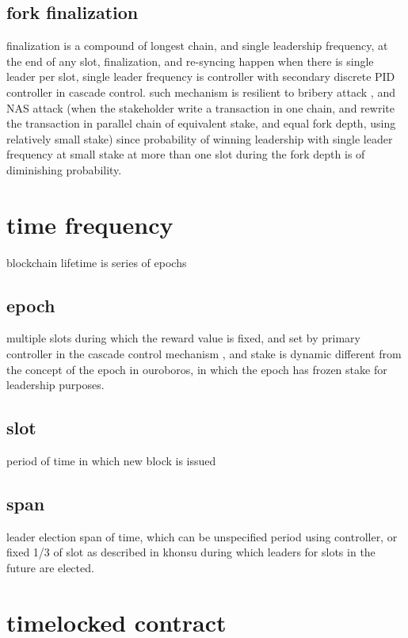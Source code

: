 \documentclass{article}
\begin{document}
\subsection{fork finalization}
finalization is a compound of longest chain, and single leadership frequency, at the end of any slot, finalization, and re-syncing happen when there is single leader per slot, single leader frequency is controller with secondary discrete PID controller in cascade control.
such mechanism is resilient to bribery attack \cite{attack_bribery}, and NAS attack (when the stakeholder write a transaction in one chain, and rewrite the transaction in parallel chain of equivalent stake, and equal fork depth, using relatively small stake) since probability of winning leadership with single leader frequency at small stake at more than one slot during the fork depth  is of diminishing probability.


\section {time frequency}
blockchain lifetime is series of epochs

\subsection {epoch}
multiple slots during which the reward value is fixed, and set by primary controller in the cascade control mechanism \cite{cascade}, and stake is dynamic different from the concept of the epoch in ouroboros, in which the epoch has frozen stake for leadership purposes.

\subsection {slot}
period of time in which new block is issued

\subsection {span}
leader election span of time, which can be unspecified period using controller, or fixed 1/3 of slot as described in khonsu \cite{khonsu} during which leaders for slots in the future are elected.

\section {timelocked contract}
\label{timelocked}
\end{document}
